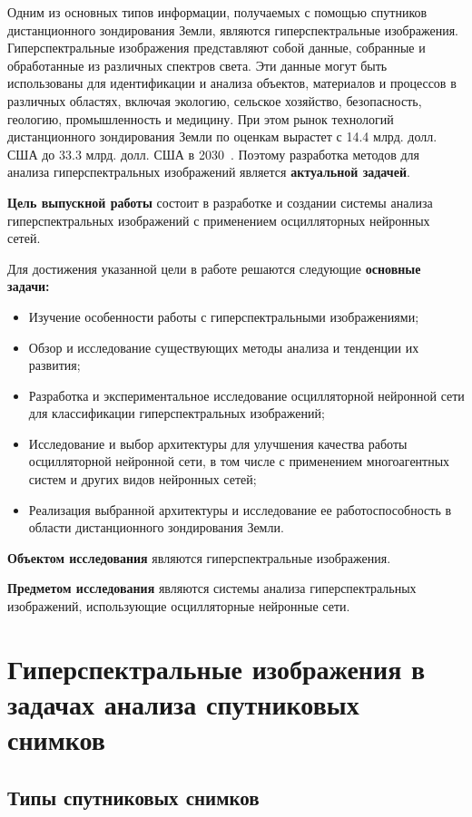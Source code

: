 \documentclass[14pt, russian]{scrartcl}
\begin{document}
Одним из основных типов информации, получаемых с помощью спутников дистанционного зондирования Земли,
являются гиперспектральные изображения. Гиперспектральные изображения представляют собой данные, собранные и обработанные
из различных спектров света. Эти данные могут быть использованы для идентификации и анализа объектов, материалов и процессов в различных
областях, включая экологию, сельское хозяйство, безопасность, геологию, промышленность и медицину.
При этом рынок технологий дистанционного зондирования Земли по оценкам вырастет с 14.4 млрд. долл. США до 33.3 млрд. долл. США в 2030~\cite{5}.
Поэтому разработка методов для анализа гиперспектральных изображений является \textbf{актуальной задачей}.

\textbf{Цель выпускной работы} состоит в разработке и создании системы анализа гиперспектральных изображений с применением осцилляторных нейронных сетей.

Для достижения указанной цели в работе решаются следующие \textbf{основные задачи:}

\begin{itemize}
    \item Изучение особенности работы с гиперспектральными изображениями;
    \item Обзор и исследование существующих методы анализа и тенденции их развития;
    \item Разработка и экспериментальное исследование осцилляторной нейронной сети для классификации гиперспектральных изображений;
    \item Исследование и выбор архитектуры для улучшения качества работы осцилляторной нейронной сети, в том числе с применением многоагентных систем и других видов нейронных сетей;
    \item Реализация выбранной архитектуры и исследование ее работоспособность в области дистанционного зондирования Земли.
\end{itemize}

\textbf{Объектом исследования} являются гиперспектральные изображения.

\textbf{Предметом исследования} являются системы анализа гиперспектральных изображений, использующие осцилляторные нейронные сети.

\section{Гиперспектральные изображения в задачах анализа спутниковых снимков}

\subsection{Типы спутниковых снимков}\label{sect:sat_im_types}
\end{document}
